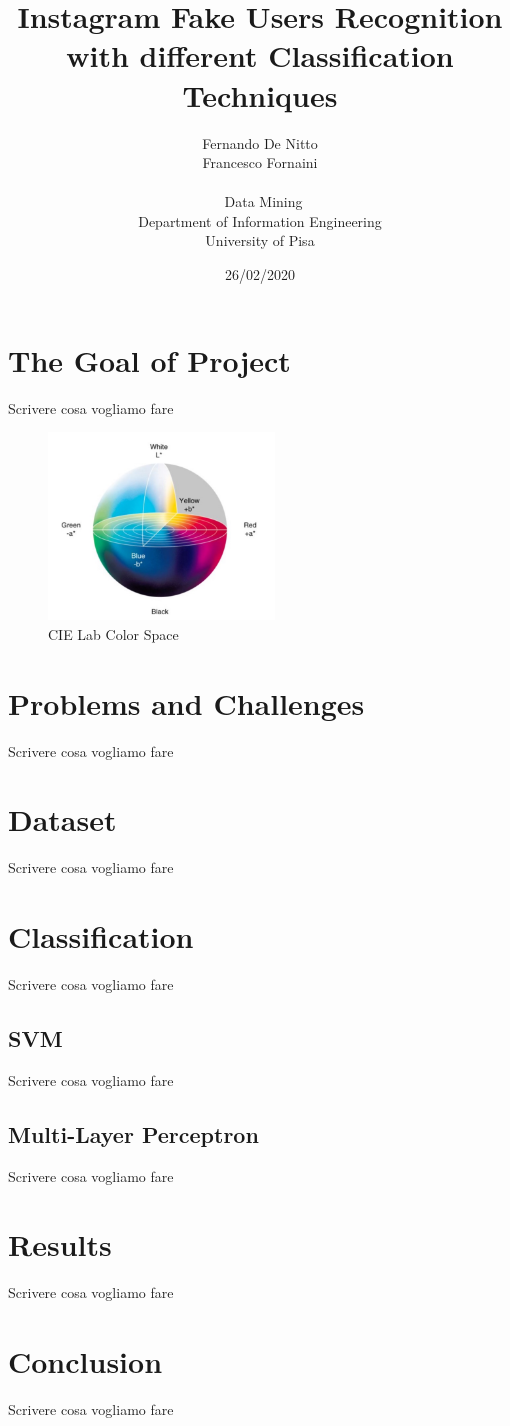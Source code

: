 \documentclass{article}
\title{Instagram Fake Users Recognition with different Classification Techniques}
\date{26/02/2020}
\author{Fernando De Nitto\\Francesco Fornaini\\\\\ Data Mining \\ Department of Information Engineering\\ University of Pisa\\}
\begin{document}
\maketitle


\section{The Goal of Project}
Scrivere cosa vogliamo fare

 \begin{figure}[!h]
 \center
  \includegraphics[width=170pt]{img/cielab.jpg}
  \caption{CIE Lab Color Space}
  \label{fig:cielab}
\end{figure}

\section{Problems and Challenges}
Scrivere cosa vogliamo fare


\section{Dataset}
Scrivere cosa vogliamo fare


\section{Classification}
Scrivere cosa vogliamo fare

\subsection{SVM}
Scrivere cosa vogliamo fare

\subsection{Multi-Layer Perceptron}
Scrivere cosa vogliamo fare

\section{Results}
Scrivere cosa vogliamo fare

\section{Conclusion}
Scrivere cosa vogliamo fare
\end{document}
